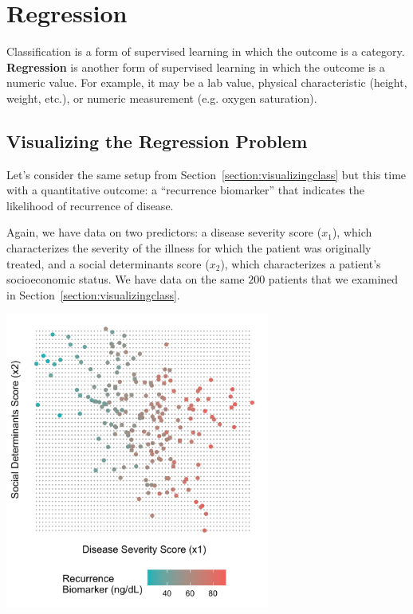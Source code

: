 \chapter{Regression \label{chapter:regression}}

Classification is a form of supervised learning in which the outcome is a category. \textbf{Regression} is another form of supervised learning in which the outcome is a numeric value. For example, it may be a lab value, physical characteristic (height, weight, etc.), or numeric measurement (e.g. oxygen saturation).


\section{Visualizing the Regression Problem \label{section:visualizingreg}}

Let's consider the same setup from Section~\ref{section:visualizingclass} but this time with a quantitative outcome: a ``recurrence biomarker'' that indicates the likelihood of recurrence of disease.

Again, we have data on two predictors: a disease severity score ($x_1$), which characterizes the severity of the illness for which the patient was originally treated, and a social determinants score ($x_2$), which characterizes a patient's socioeconomic status. We have data on the same $200$ patients that we examined in Section~\ref{section:visualizingclass}. 

\begin{center}
\includegraphics[width=0.65\textwidth]{img/esl-reg-just-data.png}
\end{center}

